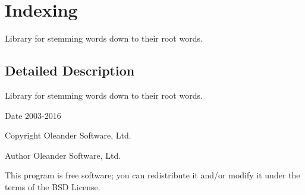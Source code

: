 \section{Indexing}
\label{group___indexing}


Library for stemming words down to their root words.  




\subsection{Detailed Description}
Library for stemming words down to their root words. 

\begin{DoxyDate}{Date}
2003-\/2016 
\end{DoxyDate}
\begin{DoxyCopyright}{Copyright}
Oleander Software, Ltd. 
\end{DoxyCopyright}
\begin{DoxyAuthor}{Author}
Oleander Software, Ltd.
\end{DoxyAuthor}
This program is free software; you can redistribute it and/or modify it under the terms of the B\+SD License. 